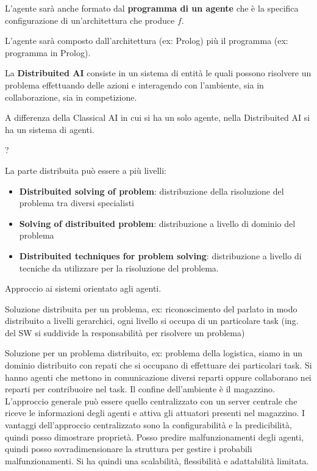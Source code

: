 L'agente sarà anche formato dal \textbf{programma di un agente} che è la specifica
configurazione di un'architettura che produce $f$.

L'agente sarà composto dall'architettura (ex: Prolog) più il programma (ex: programma in Prolog).

\begin{definizione} 
    La \textbf{Distribuited AI} consiste in un sistema di entità le quali possono
    risolvere un problema effettuando delle azioni e interagendo con l'ambiente,
    sia in collaborazione, sia in competizione.
\end{definizione}

A differenza della Classical AI in cui si ha un solo agente, nella Distribuited AI
si ha un sistema di agenti.

\begin{definizione} 
    ?
\end{definizione}

La parte distribuita può essere a più livelli:
\begin{itemize}
    \item \textbf{Distribuited solving of problem}: distribuzione della risoluzione
          del problema tra diversi specialisti
    \item \textbf{Solving of distribuited problem}: distribuzione a livello di dominio
          del problema
    \item \textbf{Distribuited techniques for problem solving}: distribuzione a livello
          di tecniche da utilizzare per la risoluzione del problema.
\end{itemize}


Approccio ai sistemi orientato agli agenti.

Soluzione distribuita per un problema, ex: riconoscimento del parlato
in modo distribuito a livelli gerarchici, ogni livello si occupa di un particolare
task (ing. del SW si suddivide la responsabilità per risolvere un problema)

Soluzione per un problema distribuito, ex: problema della logistica, siamo in un
dominio distribuito con repati che si occupano di effettuare dei particolari task.
Si hanno agenti che mettono in comunicazione diversi reparti oppure collaborano
nei reparti per contribuoire nel task. Il confine dell'ambiente è il magazzino.
L'approccio generale può essere quello centralizzato con un server centrale che
riceve le informazioni degli agenti e attiva gli attuatori presenti nel magazzino.
I vantaggi dell'approccio centralizzato sono la configurabilità e la predicibilità,
quindi posso dimostrare proprietà. Posso predire malfunzionamenti degli agenti,
quindi posso sovradimensionare la struttura per gestire i probabili malfunzionamenti.
Si ha quindi una scalabilità, flessibilità e adattabilità limitata.

